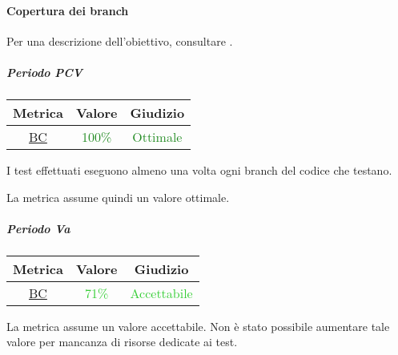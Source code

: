 			\paragraph{Copertura dei branch}
			Per una descrizione dell'obiettivo, consultare .
				\subparagraph{Periodo PCV}
				
				\begin{table}[H]
					\centering
					\begin{tabular}{  c | c | c}
						\hline
						\textbf{Metrica} & \textbf{Valore} & \textbf{Giudizio} \\
						\hline
						\hyperref[MMC]{BC}   & \textcolor{ForestGreen}{100\%}          & \textcolor{ForestGreen}{Ottimale}  \\ \hline
					\end{tabular} 
				\end{table}
			
			I test effettuati eseguono almeno una volta ogni branch del codice che testano. 
			
			La metrica assume quindi un valore ottimale.
			
			\subparagraph{Periodo Va}
			
			\begin{table}[H]
				\centering
				\begin{tabular}{  c | c | c}
					\hline
					\textbf{Metrica} & \textbf{Valore} & \textbf{Giudizio} \\
					\hline
					\hyperref[MMC]{BC}   & \textcolor{LimeGreen}{71\%}          & \textcolor{LimeGreen}{Accettabile}  \\ \hline
				\end{tabular} 
			\end{table}
			
			La metrica assume un valore accettabile. Non è stato possibile aumentare tale valore per mancanza di risorse dedicate ai test.
			
			
			
			
			
			
				
					